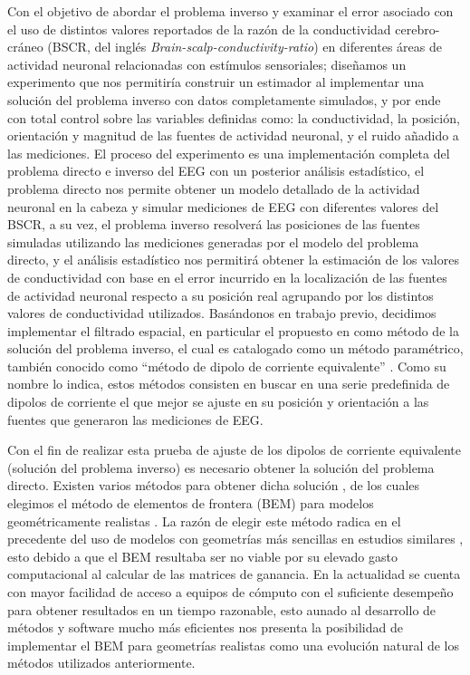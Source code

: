 Con el objetivo de abordar el problema inverso y examinar el error asociado con el uso de distintos valores reportados de la razón de la conductividad cerebro-cráneo (BSCR, del inglés \emph{Brain-scalp-conductivity-ratio}) \cite{McCann2019} en diferentes áreas de actividad neuronal relacionadas con estímulos sensoriales; diseñamos un experimento que nos permitiría construir un estimador al implementar una solución del problema inverso con datos completamente simulados, y por ende con total control sobre las variables definidas como: la conductividad, la posición, orientación y magnitud de las fuentes de actividad neuronal, y el ruido añadido a las mediciones. El proceso del experimento es una implementación completa del problema directo e inverso del EEG con un posterior análisis estadístico, el problema directo nos permite obtener un modelo detallado de la actividad neuronal en la cabeza y simular mediciones de EEG con diferentes valores del BSCR, a su vez, el problema inverso resolverá las posiciones de las fuentes simuladas utilizando las mediciones generadas por el modelo del problema directo, y el análisis estadístico nos permitirá obtener la estimación de los valores de conductividad con base en el error incurrido en la localización de las fuentes de actividad neuronal respecto a su posición real agrupando por los distintos valores de conductividad utilizados. Basándonos en trabajo previo, decidimos implementar el filtrado espacial, en particular el propuesto en \cite{VanVeen1988} como método de la solución del problema inverso, el cual es catalogado como un método paramétrico, también conocido como ``método de dipolo de corriente equivalente'' \cite{Hallez2007}. Como su nombre lo indica, estos métodos consisten en buscar en una serie predefinida de dipolos de corriente el que mejor se ajuste en su posición y orientación a las fuentes que generaron las mediciones de EEG.

Con el fin de realizar esta prueba de ajuste de los dipolos de corriente equivalente (solución del problema inverso) es necesario obtener la solución del problema directo. Existen varios métodos para obtener dicha solución \cite{Mosher1999}, de los cuales elegimos el método de elementos de frontera (BEM) para modelos geométricamente realistas \cite{Ermer2001}. La razón de elegir este método radica en el precedente del uso de modelos con geometrías más sencillas en estudios similares \cite{Gutierrez2004}, esto debido a que el BEM resultaba ser no viable por su elevado gasto computacional al calcular de las matrices de ganancia. En la actualidad se cuenta con mayor facilidad de acceso a equipos de cómputo con el suficiente desempeño para obtener resultados en un tiempo razonable, esto aunado al desarrollo de métodos y software mucho más eficientes \cite{open,Clerc2010} nos presenta la posibilidad de implementar el BEM para geometrías realistas como una evolución natural de los métodos utilizados anteriormente.


